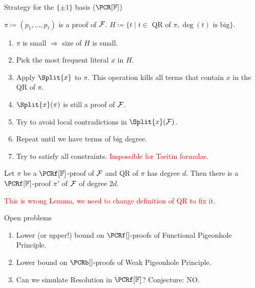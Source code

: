 \begin{frame}{Strategy for the $\{\pm 1\}$ basis ($\PCR[\field]$)}
    
    $\pi \coloneqq (p_1, \dots, p_{\ell})$ is a proof of $\mathcal{F}$. $H \coloneqq \{t \mid t \in \text{ QR of }
    \pi, \deg(t) \text{ is big}\}$.

    \begin{enumerate}
        \item $\pi$ is small $\Rightarrow$ size of $H$ is small.
        \pause
        \item Pick the most frequent literal $x$ in $H$.
        \pause
        \item Apply $\Split{x}$ to $\pi$. This operation kills all terms that contain $x$ in the QR of $\pi$.
        \pause
        \item $\Split{x}(\pi)$ is still a proof of  $\mathcal{F}$.
        \pause
        \item Try to avoid local contradictions in $\Split{x}(\Fs)$. 
        \pause
        \item Repeat until we have terms of big degree.    
        \vspace{0.3cm}
        \pause
        \item Try to satisfy all  constraints. \pause \textcolor{red}{Impossible for
            Tseitin formulas.}
    \end{enumerate}

    \pause
    \begin{lemma}
        Let $\pi$ be a $\PCRf[\field]$-proof of $\mathcal{F}$ and QR of $\pi$ has degree $d$. Then there is a
        $\PCRf[\field]$-proof $\pi'$ of $\mathcal{F}$ of degree $2d$.
    \end{lemma}
    \pause
    \textcolor{red}{This is wrong Lemma, we need to change definition of QR to fix it.}
\end{frame}


\begin{frame}{Open problems}

    \begin{enumerate}
        \item Lower (or upper!) bound on $\PCRf[]$-proofs of Functional Pigeonhole Principle.
        \item Lower bound on $\PCRb[]$-proofs of Weak Pigeonhole Principle.

            
        \pause
        \item Can we simulate Resolution in $\PCRf[\field]$? \pause Conjecture: NO.
    \end{enumerate}
\end{frame}